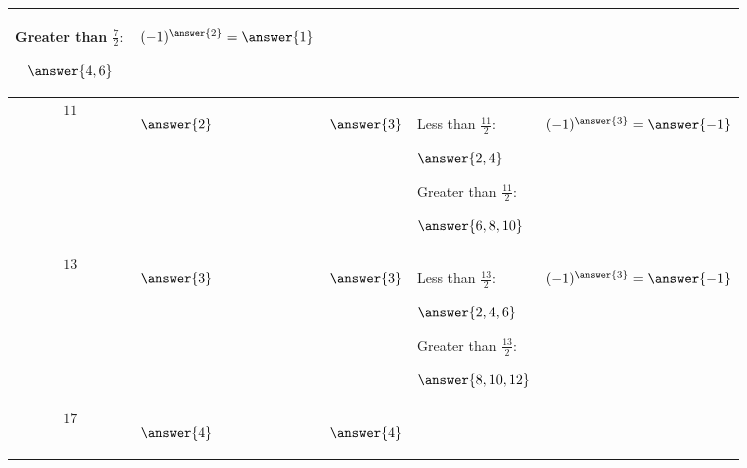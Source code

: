 \documentclass[handout]{ximera}
\begin{document}
\begin{br}
\begin{tabular}{c|p{1.5cm}|p{2.5cm}|p{7cm}|p{3cm}}
{                \\Greater than $\tfrac{7}{2}:$ \begin{prompt}
            $\answer{4,6}$\end{prompt}}
                & \begin{prompt}
            $(-1)^{\answer{2}}=\answer{1}$\end{prompt}\\\hline
        $11$ & \begin{prompt}
            $\answer{2}$\end{prompt}	& \begin{prompt}
            $\answer{3}$\end{prompt}
                & \makecell[l]{Less than $\tfrac{11}{2}:$ \begin{prompt}
            $\answer{2,4}$\end{prompt}
                \\Greater than $\tfrac{11}{2}:$ \begin{prompt}
            $\answer{6,8,10}$\end{prompt}}
                & \begin{prompt}
            $(-1)^{\answer{3}}=\answer{-1}$\end{prompt}\\\hline
        $13$ & \begin{prompt}
            $\answer{3}$\end{prompt}	& \begin{prompt}
            $\answer{3}$\end{prompt}
                & \makecell[l]{Less than $\tfrac{13}{2}:$ \begin{prompt}
            $\answer{2,4,6}$\end{prompt}
                \\Greater than $\tfrac{13}{2}:$ \begin{prompt}
            $\answer{8,10,12}$\end{prompt}}
                & \begin{prompt}
            $(-1)^{\answer{3}}=\answer{-1}$\end{prompt}\\\hline
        $17$ & \begin{prompt}
            $\answer{4}$\end{prompt}	& \begin{prompt}
            $\answer{4}$\end{prompt}
                & \makecell[l]{Less than $\tfrac{17}{2}:$ \begin{prompt}

\end{prompt}}
\end{tabular}
\end{br}
\end{document}
